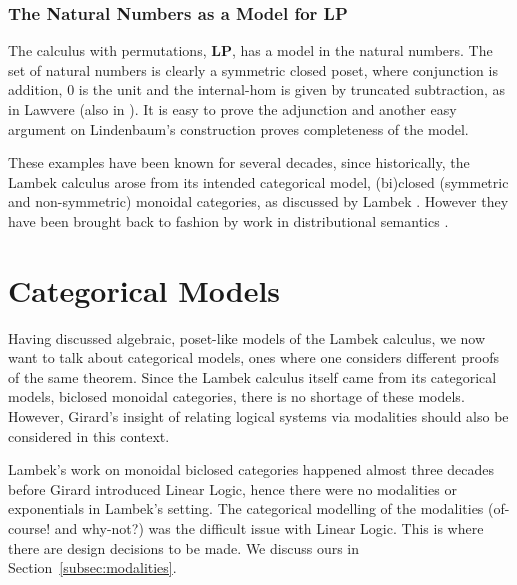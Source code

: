 \documentclass{llncs}
\begin{document}
\subsubsection{The Natural Numbers as a Model for LP}
\label{subsec:the_set_of_natural_numbers}
The calculus with permutations, $\textbf{LP}$, has a model in the natural numbers.
The set of natural numbers is
clearly a symmetric closed poset, where conjunction is addition, $0$ is the unit and the
internal-hom is given by truncated subtraction, as in Lawvere \cite{lawvere1973} (also in  \cite{depaiva1991, Hyland:1991}).  It is easy
to prove the adjunction and another easy argument on Lindenbaum's construction  proves completeness of the model.

These examples have been known for several decades, since historically, the Lambek calculus arose from its intended categorical model, (bi)closed (symmetric and non-symmetric) monoidal categories, as discussed by Lambek \cite{lambek1988}. However they have been brought back to fashion by work in distributional semantics \cite{coecke2013}.


\section{Categorical Models}

Having discussed algebraic, poset-like models of the Lambek calculus,
we now want to talk about categorical models, ones where one considers
different proofs of the same theorem. Since the Lambek calculus itself
came from its categorical models, biclosed monoidal categories, there
is no shortage of these models. However, Girard's insight of relating
logical systems via modalities should also be considered in this
context.

Lambek's work on monoidal biclosed categories happened almost three
decades before Girard introduced Linear Logic, hence there were no
modalities or exponentials in Lambek's setting. The categorical
modelling of the modalities (of-course! and why-not?) was the
difficult issue with Linear Logic.
This is where there are design decisions to be made. We discuss ours
in Section~\ref{subsec:modalities}.
\end{document}
